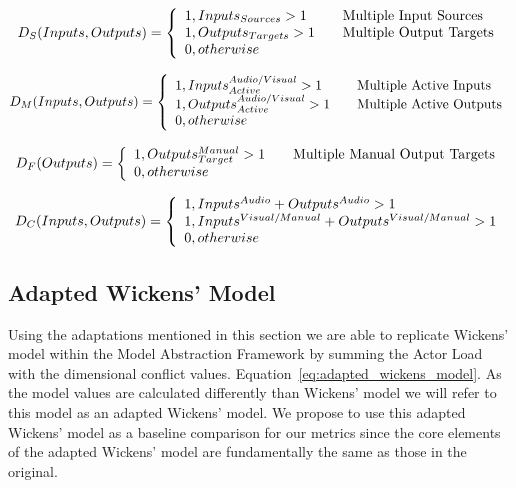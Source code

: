 \begin{equation}
D_{S}(Inputs, Outputs) = \left\{ 
  \begin{array}{l l}
    1, Inputs_{Sources} > 1 & \quad \text{Multiple Input Sources}\\
    1, Outputs_{Targets} > 1 & \quad \text{Multiple Output Targets}\\
    0, otherwise
  \end{array}
  \right.
  \label{eq:stage_dimension}
\end{equation}

\begin{equation}
D_{M}(Inputs, Outputs) = \left\{ 
  \begin{array}{l l}
    1, Inputs_{Active}^{Audio/Visual} > 1 & \quad \text{Multiple Active Inputs}\\
    1, Outputs_{Active}^{Audio/Visual} > 1 & \quad \text{Multiple Active Outputs}\\
    0, otherwise
  \end{array}
  \right.
  \label{eq:modality_dimension}
\end{equation}

\begin{equation}
D_{F}(Outputs) = \left\{ 
  \begin{array}{l l}
    1, Outputs_{Target}^{Manual} > 1 & \quad \text{Multiple Manual Output Targets}\\
    0, otherwise
  \end{array}
  \right.
  \label{eq:focus_dimension}
\end{equation}

\begin{equation}
D_{C}(Inputs, Outputs) = \left\{ 
  \begin{array}{l l}
    1, Inputs^{Audio} + Outputs^{Audio} > 1\\
    1, Inputs^{Visual/Manual} + Outputs^{Visual/Manual} > 1\\
    0, otherwise
  \end{array}
  \right.
  \label{eq:codes_dimension}
\end{equation}


\subsection{Adapted Wickens' Model}
Using the adaptations mentioned in this section we are able to replicate Wickens' model within the Model Abstraction Framework by summing the Actor Load with the dimensional conflict values.  Equation~\ref{eq:adapted_wickens_model}.  As the model values are calculated differently than Wickens' model we will refer to this model as an adapted Wickens' model.  We propose to use this adapted Wickens' model as a baseline comparison for our metrics since the core elements of the adapted Wickens' model are fundamentally the same as those in the original.  

